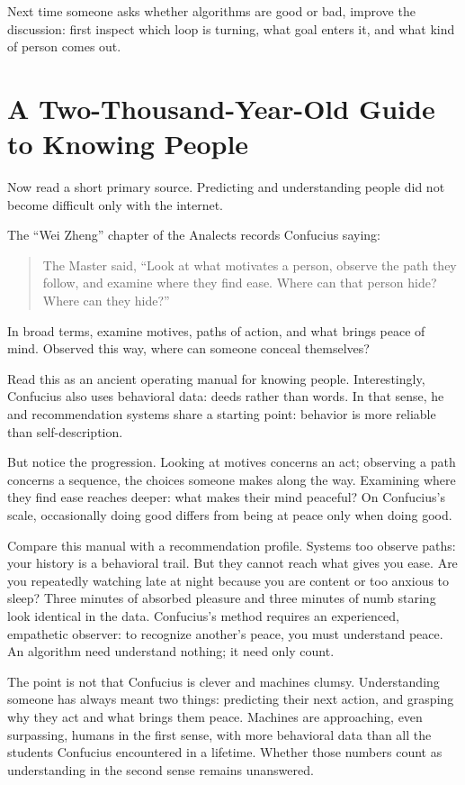 Next time someone asks whether algorithms are good or bad, improve the discussion: first inspect which loop is turning, what goal enters it, and what kind of person comes out.

\section[An Ancient Guide to Knowing People]{A Two-Thousand-Year-Old Guide to Knowing People}
Now read a short primary source. Predicting and understanding people did not become difficult only with the internet.

The ``Wei Zheng'' chapter of the Analects records Confucius saying:

\begin{quote}
The Master said, ``Look at what motivates a person, observe the path they follow, and examine where they find ease. Where can that person hide? Where can they hide?''
\end{quote}
In broad terms, examine motives, paths of action, and what brings peace of mind. Observed this way, where can someone conceal themselves?

Read this as an ancient operating manual for knowing people. Interestingly, Confucius also uses behavioral data: deeds rather than words. In that sense, he and recommendation systems share a starting point: behavior is more reliable than self-description.

But notice the progression. Looking at motives concerns an act; observing a path concerns a sequence, the choices someone makes along the way. Examining where they find ease reaches deeper: what makes their mind peaceful? On Confucius's scale, occasionally doing good differs from being at peace only when doing good.

Compare this manual with a recommendation profile. Systems too observe paths: your history is a behavioral trail. But they cannot reach what gives you ease. Are you repeatedly watching late at night because you are content or too anxious to sleep? Three minutes of absorbed pleasure and three minutes of numb staring look identical in the data. Confucius's method requires an experienced, empathetic observer: to recognize another's peace, you must understand peace. An algorithm need understand nothing; it need only count.

The point is not that Confucius is clever and machines clumsy. Understanding someone has always meant two things: predicting their next action, and grasping why they act and what brings them peace. Machines are approaching, even surpassing, humans in the first sense, with more behavioral data than all the students Confucius encountered in a lifetime. Whether those numbers count as understanding in the second sense remains unanswered.

